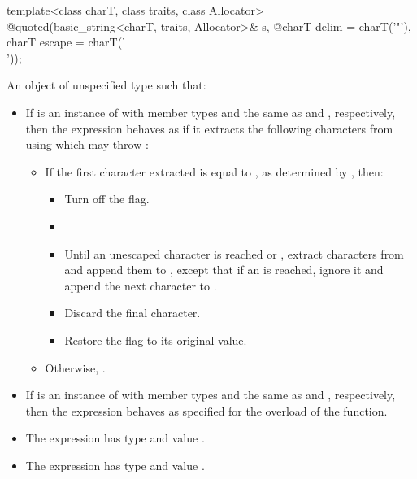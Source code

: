 %
\begin{itemdecl}
template<class charT, class traits, class Allocator>
  @\unspec@ quoted(basic_string<charT, traits, Allocator>& s,
  @\itcorr@                   charT delim = charT('"'), charT escape = charT('\\'));
\end{itemdecl}

\begin{itemdescr}
\pnum
\returns
An object of unspecified type such that:
\begin{itemize}
\item If  is an instance of  with member types
 and  the same as 
and , respectively, then the expression
 behaves as if it extracts the following
characters from  using
which may throw :
\begin{itemize}
\item If the first character extracted is equal to , as
determined by , then:
\begin{itemize}
\item Turn off the  flag.
\item {}
\item Until an unescaped  character is reached or ,
extract characters from  and append them to , except that
if an  is reached, ignore it and append the next character to
.
\item Discard the final  character.
\item Restore the  flag to its original value.
\end{itemize}
\item Otherwise, .
\end{itemize}
\item If  is an instance of  with member types
 and  the same as  and
, respectively, then the expression
 behaves as specified for the
 overload of the
 function.
\item
The expression  has type
 and value .
\item
The expression  has type
 and value .
\end{itemize}
\end{itemdescr}

